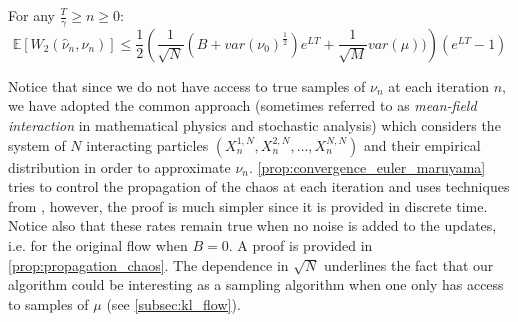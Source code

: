 \begin{theorem}\label{prop:convergence_euler_maruyama}
	For any $\frac{T}{\gamma}\geq n\geq 0$:
\[
\mathbb{E}[W_{2}(\hat{\nu}_{n},\nu_{n})]\leq \frac{1}{2}\left(\frac{1}{\sqrt{N}}(B+var(\nu_{0})^{\frac{1}{2}})e^{LT}+\frac{1}{\sqrt{M}}var(\mu))\right)(e^{LT}-1)
\]
\end{theorem}
Notice that since we do not have access to true samples of $\nu_n$ at each iteration $n$, we have adopted the common approach (sometimes referred to as \textit{mean-field interaction} in mathematical physics and stochastic analysis) which considers the system of  $N$ interacting particles $(X_n^{1,N}, X_n^{2,N}, \dots, X_n^{N,N})$ and their empirical distribution in order to approximate $\nu_n$.
\cref{prop:convergence_euler_maruyama} tries to control the propagation of the chaos at each iteration and uses techniques from \cite{Jourdain:2007}, however, the proof is much simpler since it is provided in discrete time. Notice also that these rates remain true when no noise is added to the updates, i.e. for the original flow when $B=0$. A proof is provided in \cref{prop:propagation_chaos}. The dependence in $\sqrt{N}$ underlines the fact that our algorithm could be interesting as a sampling algorithm when one only has access to samples of $\mu$ (see \cref{subsec:kl_flow}).













